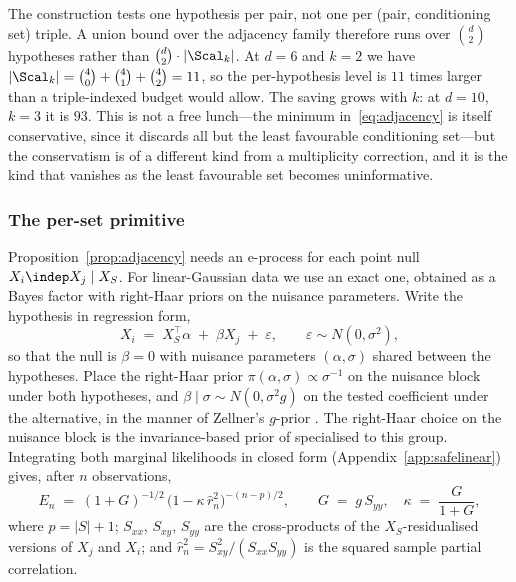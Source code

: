 \begin{remark}\label{rem:multiplicity-pairs}
The construction tests one hypothesis per pair, not one per (pair,
conditioning set) triple. A union bound over the adjacency family therefore
runs over $\binom{d}{2}$ hypotheses rather than
$\binom{d}{2} \cdot |\Scal_k|$. At $d = 6$ and $k = 2$ we have
$|\Scal_k| = \binom{4}{0} + \binom{4}{1} + \binom{4}{2} = 11$, so the
per-hypothesis level is $11$ times larger than a triple-indexed budget would
allow. The saving grows with $k$: at $d = 10$, $k = 3$ it is $93$. This is not
a free lunch---the minimum in~\eqref{eq:adjacency} is itself conservative,
since it discards all but the least favourable conditioning set---but the
conservatism is of a different kind from a multiplicity correction, and it is
the kind that vanishes as the least favourable set becomes uninformative.
\end{remark}

\subsubsection{The per-set primitive}\label{sec:primitive}

Proposition~\ref{prop:adjacency} needs an e-process for each point null
$X_i \indep X_j \mid X_S$. For linear-Gaussian data we use an exact one,
obtained as a Bayes factor with right-Haar priors on the nuisance parameters.
Write the hypothesis in regression form,
\begin{equation}\label{eq:regform}
X_i \;=\; X_S^\top \alpha \;+\; \beta X_j \;+\; \varepsilon,
\qquad \varepsilon \sim N(0, \sigma^2),
\end{equation}
so that the null is $\beta = 0$ with nuisance parameters $(\alpha, \sigma)$
shared between the hypotheses. Place the right-Haar prior
$\pi(\alpha, \sigma) \propto \sigma^{-1}$ on the nuisance block under both
hypotheses, and $\beta \mid \sigma \sim N(0, \sigma^2 g)$ on the tested
coefficient under the alternative, in the manner of Zellner's $g$-prior
\citep{zellner1986assessing}. The right-Haar choice on the nuisance block is
the invariance-based prior of \citet{jeffreys1946invariant} specialised to
this group. Integrating both marginal likelihoods in
closed form (Appendix~\ref{app:safelinear}) gives, after $n$ observations,
\begin{equation}\label{eq:safelinear}
E_n \;=\; (1+G)^{-1/2}\,\bigl(1 - \kappa\,\hat r_n^2\bigr)^{-(n-p)/2},
\qquad
G \;=\; g\,S_{yy}, \quad \kappa \;=\; \frac{G}{1+G},
\end{equation}
where $p = |S| + 1$; $S_{xx}$, $S_{xy}$, $S_{yy}$ are the cross-products of
the $X_S$-residualised versions of $X_j$ and $X_i$; and
$\hat r_n^2 = S_{xy}^2 / (S_{xx} S_{yy})$ is the squared sample partial
correlation.

